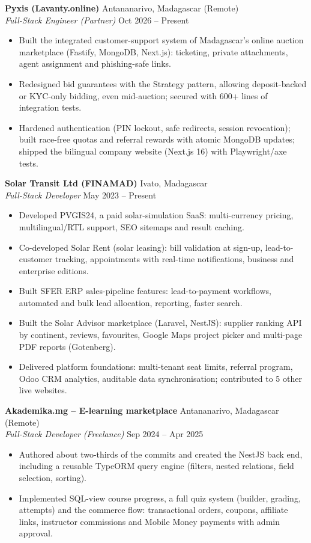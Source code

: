 \documentclass[10pt,a4paper]{article}
\newcommand{\role}[4]{%
  \vspace{3pt}%
  \textbf{#1} \hfill #2\\[-0.1em]
  \textit{#3} \hfill #4\par\vspace{1pt}}
\begin{document}
\role{Pyxis (Lavanty.online)}{Antananarivo, Madagascar (Remote)}{Full-Stack Engineer (Partner)}{Oct 2026 -- Present}
\begin{itemize}
  \item Built the integrated customer-support system of Madagascar's online auction marketplace (Fastify, MongoDB, Next.js): ticketing, private attachments, agent assignment and phishing-safe links.
  \item Redesigned bid guarantees with the Strategy pattern, allowing deposit-backed or KYC-only bidding, even mid-auction; secured with 600+ lines of integration tests.
  \item Hardened authentication (PIN lockout, safe redirects, session revocation); built race-free quotas and referral rewards with atomic MongoDB updates; shipped the bilingual company website (Next.js 16) with Playwright/axe tests.
\end{itemize}

\role{Solar Transit Ltd (FINAMAD)}{Ivato, Madagascar}{Full-Stack Developer}{May 2023 -- Present}
\begin{itemize}
  \item Developed PVGIS24, a paid solar-simulation SaaS: multi-currency pricing, multilingual/RTL support, SEO sitemaps and result caching.
  \item Co-developed Solar Rent (solar leasing): bill validation at sign-up, lead-to-customer tracking, appointments with real-time notifications, business and enterprise editions.
  \item Built SFER ERP sales-pipeline features: lead-to-payment workflows, automated and bulk lead allocation, reporting, faster search.
  \item Built the Solar Advisor marketplace (Laravel, NestJS): supplier ranking API by continent, reviews, favourites, Google Maps project picker and multi-page PDF reports (Gotenberg).
  \item Delivered platform foundations: multi-tenant seat limits, referral program, Odoo CRM analytics, auditable data synchronisation; contributed to 5 other live websites.
\end{itemize}

\role{Akademika.mg -- E-learning marketplace}{Antananarivo, Madagascar (Remote)}{Full-Stack Developer (Freelance)}{Sep 2024 -- Apr 2025}
\begin{itemize}
  \item Authored about two-thirds of the commits and created the NestJS back end, including a reusable TypeORM query engine (filters, nested relations, field selection, sorting).
  \item Implemented SQL-view course progress, a full quiz system (builder, grading, attempts) and the commerce flow: transactional orders, coupons, affiliate links, instructor commissions and Mobile Money payments with admin approval.
\end{itemize}
\end{document}
